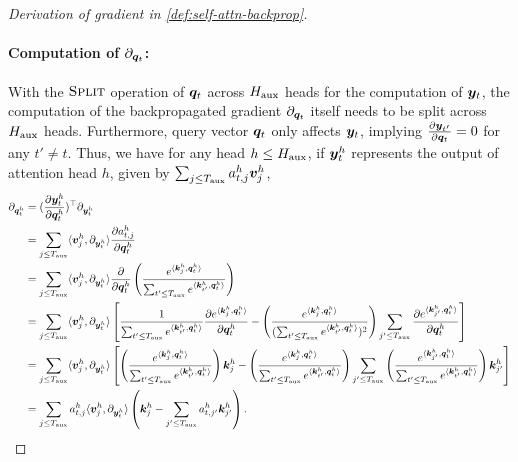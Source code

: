 \begin{proof}[Derivation of gradient in \cref{def:self-attn-backprop}]
    \paragraph{Computation of $ \partial_{{\bm{q}}_t}$: } 
    With the $\textsc{Split}$ operation of ${\bm{q}}_t$ across $H_{\text{aux}}$ heads for the computation of ${\bm{y}}_t$, the computation of the backpropagated gradient $\partial_{{\bm{q}}_t}$ itself needs to be split across $H_{\text{aux}}$ heads. Furthermore, query vector ${\bm{q}}_t$ only affects ${\bm{y}}_t$, implying $\frac{ \partial {\bm{y}}_{t'}}{\partial {\bm{q}}_t} = 0$ for any $t' \ne t$.
    Thus, we have for any head $h \le H_{\text{aux}}$, if ${\bm{y}}_t^h$ represents the output of attention head $h$, given by $\sum_{j \le T_{\text{aux}}} a^h_{t, j} {\bm{v}}_j^h$, 
    \begingroup
    \allowdisplaybreaks
    \begin{align}
        \partial_{{\bm{q}}_t^h} &= ( \frac{ \partial {\bm{y}}_t^h }{ \partial {\bm{q}}_t^h } )^{\top} \partial_{{\bm{y}}_t^h} \nonumber \\
        &= \sum_{j \le T_{\text{aux}}}  \langle {\bm{v}}_j^h, \partial_{{\bm{y}}_t^h} \rangle \frac{ \partial a^h_{t, j} }{ \partial {\bm{q}}_t^h } \nonumber  \\ &= 
        \sum_{j \le T_{\text{aux}}}  \langle {\bm{v}}_j^h, \partial_{{\bm{y}}_t^h} \rangle \frac{ \partial }{ \partial {\bm{q}}_t^h } \left( \frac{ e^{ \langle {\bm{k}}_j^h , {\bm{q}}_t^h \rangle }  }{ \sum_{t' \le T_{\text{aux}}} e^{  \langle {\bm{k}}_{t'}^h , {\bm{q}}_t^h \rangle } } \right) \label{eq:softmax_expand}  \\
        &= \sum_{j \le T_{\text{aux}}}  \langle {\bm{v}}_j^h, \partial_{{\bm{y}}_t^h} \rangle  \left[   \frac{1}{ \sum_{t' \le T_{\text{aux}}} e^{  \langle {\bm{k}}_{t'}^h , {\bm{q}}_t^h \rangle }  } \frac{ \partial e^{ \langle {\bm{k}}_j^h , {\bm{q}}_t^h \rangle } }{ \partial {\bm{q}}_t^h }  -  \left( \frac{ e^{ \langle {\bm{k}}_j^h , {\bm{q}}_t^h \rangle }  }{ (\sum_{t' \le T_{\text{aux}}} e^{  \langle {\bm{k}}_{t'}^h , {\bm{q}}_t^h \rangle })^2  }\right)  \sum_{j' \le T_{\text{aux}}} \frac{ \partial e^{ \langle {\bm{k}}_{j'}^h , {\bm{q}}_t^h \rangle } }{ \partial {\bm{q}}_t^h }  \right]
        \label{eq:query_expand_fractionderivation} \\
        &= \sum_{j \le T_{\text{aux}}}  \langle {\bm{v}}_j^h, \partial_{{\bm{y}}_t^h} \rangle  \left[  \left( \frac{ e^{ \langle {\bm{k}}_j^h , {\bm{q}}_t^h \rangle }  }{ \sum_{t' \le T_{\text{aux}}} e^{  \langle {\bm{k}}_{t'}^h , {\bm{q}}_t^h \rangle } } \right) {\bm{k}}_j^h  - \left( \frac{ e^{ \langle {\bm{k}}_j^h , {\bm{q}}_t^h \rangle }  }{ \sum_{t' \le T_{\text{aux}}} e^{  \langle {\bm{k}}_{t'}^h , {\bm{q}}_t^h \rangle } } \right) \sum_{j' \le T_{\text{aux}}} \left( \frac{ e^{ \langle {\bm{k}}_{j'}^h , {\bm{q}}_t^h \rangle }  }{ \sum_{t' \le T_{\text{aux}}} e^{  \langle {\bm{k}}_{t'}^h , {\bm{q}}_t^h \rangle } } \right) {\bm{k}}^h_{j'}  \right] \label{eq:query_expanded_fractionderivation}  \\&
        = \sum_{j \le T_{\text{aux}}}  a^h_{t, j} \langle {\bm{v}}_j^h, \partial_{{\bm{y}}_t^h} \rangle \left( {\bm{k}}_j^h - \sum_{j' \le T_{\text{aux}}} a^h_{t, j'}  {\bm{k}}^h_{j'} \right). \nonumber 
    \end{align}
    \endgroup
    

\end{proof}
